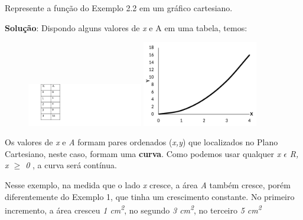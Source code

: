 \begin{texemplo}
Represente a função do Exemplo 2.2 em um gráfico cartesiano.

\textbf{Solução}: Dispondo alguns valores de \textit{x} e A em uma tabela, temos: 

\begin{figure}[H]
    \includegraphics[width=0.45\textwidth]{capitulos/funcao_do_primeiro_grau/media/image5.pdf} 
    \includegraphics[width=0.45\textwidth]{capitulos/funcao_do_primeiro_grau/media/image6.pdf}
\end{figure}

Os valores de \textit{x} e \textit{A} formam pares ordenados (\textit{x,y}) que localizados no Plano Cartesiano, neste caso, formam uma \textbf{curva}. Como podemos usar qualquer \textit{x $ \epsilon $  R, x $ \geq $  0} , a curva será contínua.

Nesse exemplo, na medida que o lado \textit{x} cresce, a área \textit{A} também cresce, porém diferentemente do Exemplo 1, que tinha um crescimento constante. No primeiro incremento, a área cresceu \textit{1 cm\textsuperscript{2}}, no segundo \textit{3 cm\textsuperscript{2}}, no terceiro \textit{5 cm\textsuperscript{2}} \qedsymbol{}
\end{texemplo}

